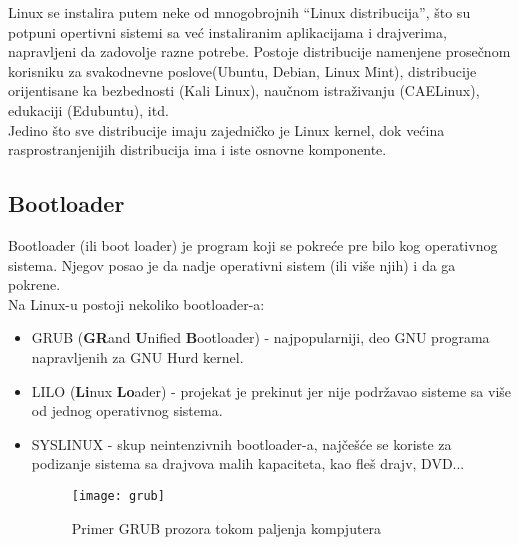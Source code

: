 Linux se instalira putem neke od mnogobrojnih ``Linux distribucija'', što su potpuni opertivni sistemi sa već instaliranim aplikacijama i  drajverima, napravljeni da zadovolje razne potrebe. Postoje distribucije namenjene prosečnom korisniku za svakodnevne poslove(Ubuntu, Debian, Linux Mint), distribucije orijentisane ka bezbednosti (Kali Linux), naučnom istraživanju (CAELinux), edukaciji (Edubuntu), itd.\\
Jedino što sve distribucije imaju zajedničko je Linux kernel, dok većina rasprostranjenijih distribucija ima i iste osnovne komponente.

\subsection{Bootloader}
Bootloader (ili boot loader) je program koji se pokreće pre bilo kog operativnog sistema. Njegov posao je da nadje operativni sistem (ili više njih) i da ga pokrene. \\Na Linux-u postoji nekoliko bootloader-a:\begin{itemize}
\item GRUB (\textbf{GR}and \textbf{U}nified \textbf{B}ootloader) - najpopularniji, deo GNU programa napravljenih za GNU Hurd kernel.
\item LILO (\textbf{Li}nux \textbf{Lo}ader) - projekat je prekinut jer nije podržavao sisteme sa više od jednog operativnog sistema.
\item SYSLINUX - skup neintenzivnih bootloader-a, najčešće se koriste za podizanje sistema sa drajvova malih kapaciteta, kao fleš drajv, DVD...
\begin{figure}[H]
	\centering
	\texttt{[image: grub]}
	\caption{Primer GRUB prozora tokom paljenja kompjutera}
\end{figure}
\end{itemize}


